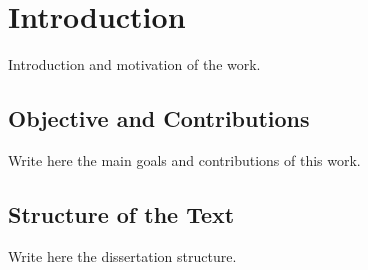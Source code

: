 \chapter{Introduction}\label{chap:Intro}

Introduction and motivation of the work.

\section{Objective and Contributions}

Write here the main goals and contributions of this work.

\section{Structure of the Text}

Write here the dissertation structure.
